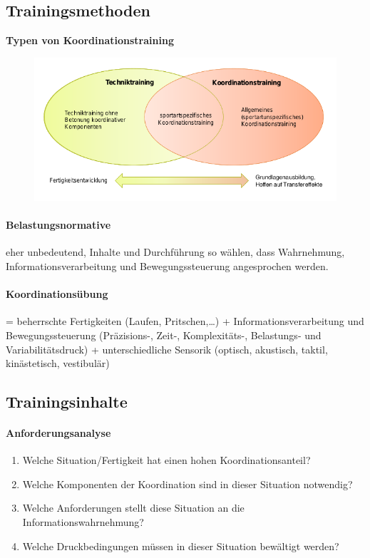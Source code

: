 \subsection{Trainingsmethoden}
\textbf{Typen von Koordinationstraining}
\begin{figure}[H]
  \centering
  \includegraphics[width=.7\textwidth]{pictures/koordinationstraining_typen.png}
\end{figure}
\paragraph{Belastungsnormative} eher unbedeutend, Inhalte und Durchführung so wählen, dass Wahrnehmung, Informationsverarbeitung und Bewegungssteuerung angesprochen werden.
\paragraph{Koordinationsübung} = beherrschte Fertigkeiten (Laufen, Pritschen,\ldots) + Informationsverarbeitung und Bewegungssteuerung (Präzisions-, Zeit-, Komplexitäts-, Belastungs- und Variabilitätsdruck) + unterschiedliche Sensorik (optisch, akustisch, taktil, kinästetisch, vestibulär)

\subsection{Trainingsinhalte}
\paragraph{Anforderungsanalyse}
\begin{enumerate}
  \item Welche Situation/Fertigkeit hat einen hohen Koordinationsanteil?  
  \item Welche Komponenten der Koordination sind in dieser Situation notwendig?
  \item Welche Anforderungen stellt diese Situation an die Informationswahrnehmung?
  \item Welche Druckbedingungen müssen in dieser Situation bewältigt werden?
\end{enumerate}
